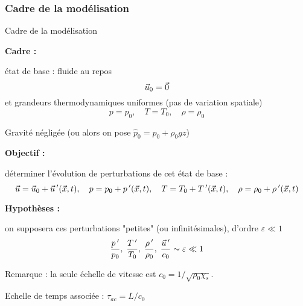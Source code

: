 \subsubsection{Cadre de la modélisation}
\begin{frame}{Cadre de la modélisation}

\small

\pause

\textbf{Cadre :} \medskip

état de base : fluide au repos
\[
	\vec{u}_0 = \vec{0}
\]
et grandeurs thermodynamiques uniformes (pas de variation spatiale) 
\[
	p=p_0, \quad T=T_0, \quad \rho = \rho_0
\]

Gravité négligée (ou alors on pose $\hat p_0 = p_0+\rho_0 g z$)

\bigskip \pause

\textbf{Objectif :} \medskip

déterminer l'évolution de perturbations de cet état de base :
\[
	\vec{u} = \vec{u}_0 + \vec{u}\ \!'(\vec{x}, t), \quad
  p = p_0 + p\ \!'(\vec{x}, t), \quad
  T = T_0 + T\ \!'(\vec{x}, t), \quad
  \rho = \rho_0 + \rho\ \!'(\vec{x}, t)
\]

\bigskip \pause

\textbf{Hypothèses :} \medskip

on supposera ces perturbations "petites" (ou infinitésimales), d'ordre $\varepsilon \ll 1$
\[
	\frac{p\ \!'}{p_0}, \; \frac{T\ \!'}{T_0}, \; \frac{\rho\ \!'}{\rho_0}, 
	\; 
	\frac{\vec{u}\ \!'}{c_0}
	\sim \varepsilon \ll 1	
\]

Remarque : la seule échelle de vitesse est $c_0 = 1/\sqrt{\rho_0 \chi_s}$.

\smallskip 
Echelle de temps associée : $\tau_{ac} =  L/c_0$ 


\vspace{10mm}

\end{frame}

